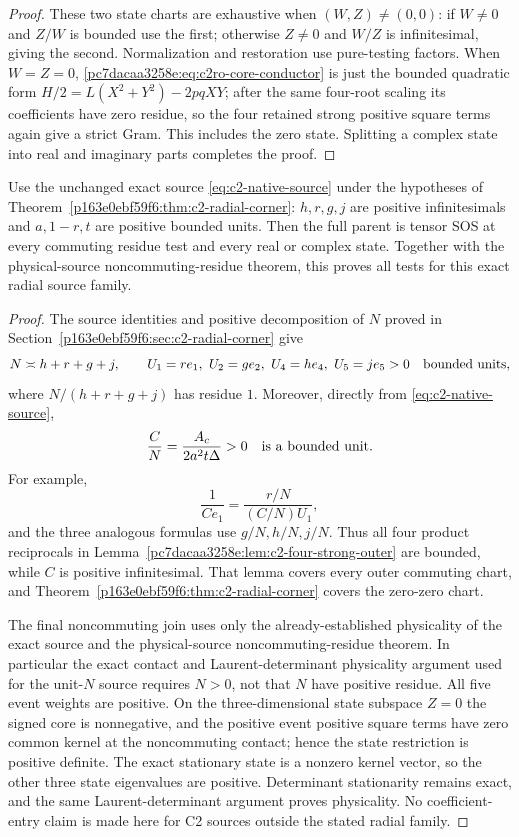 \begin{proof}
These two state charts are exhaustive when $(W,Z)\ne(0,0)$: if
$W\ne0$ and $Z/W$ is bounded use the first; otherwise $Z\ne0$ and
$W/Z$ is infinitesimal, giving the second.  Normalization and restoration
use pure-testing factors.  When $W=Z=0$,
\eqref{pc7dacaa3258e:eq:c2ro-core-conductor} is just the bounded quadratic form
$H/2=L(X^2+Y^2)-2pqXY$; after the same four-root scaling its
coefficients have zero residue, so the four retained strong positive square terms
again give a strict Gram.  This includes the zero state.  Splitting a
complex state into real and imaginary parts completes the proof.
\end{proof}

\begin{corollary}
\label{pc7dacaa3258e:cor:c2-radial-outer}
Use the unchanged exact source \eqref{eq:c2-native-source} under the hypotheses
of Theorem~\ref{p163e0ebf59f6:thm:c2-radial-corner}: $h,r,g,j$ are positive
infinitesimals and $a,1-r,t$ are positive bounded units.
Then the full parent is tensor SOS at every commuting residue test and
every real or complex state.  Together with the physical-source
noncommuting-residue theorem, this proves all tests for this exact
radial source family.
\end{corollary}
\begin{proof}
The source identities and positive decomposition of $N$ proved in
Section~\ref{p163e0ebf59f6:sec:c2-radial-corner} give
\[
 N\asymp h+r+g+j,\qquad
 U_1=re_1,\ U_2=ge_2,\ U_4=he_4,\ U_5=je_5>0
 \quad\hbox{bounded units},
\]
where $N/(h+r+g+j)$ has residue $1$.  Moreover, directly from
\eqref{eq:c2-native-source},
\[
 \frac CN=\frac{A_c}{2a^2t\Delta}>0
 \quad\hbox{is a bounded unit}.
\]
For example,
\[
 \frac1{Ce_1}=\frac{r/N}{(C/N)U_1},
\]
and the three analogous formulas use $g/N,h/N,j/N$.
Thus all four product reciprocals in
Lemma~\ref{pc7dacaa3258e:lem:c2-four-strong-outer} are bounded, while $C$ is positive
infinitesimal.  That lemma covers every outer commuting chart, and
Theorem~\ref{p163e0ebf59f6:thm:c2-radial-corner} covers the zero-zero chart.

The final noncommuting join uses only the already-established
physicality of the exact source and the physical-source
noncommuting-residue theorem.  In particular the exact contact and
Laurent-determinant physicality argument used for the unit-$N$ source
requires $N>0$, not that $N$ have positive residue.  All five event
weights are positive.  On the three-dimensional state subspace $Z=0$
the signed core is nonnegative, and the positive event positive square terms have
zero common kernel at the noncommuting contact; hence the state
restriction is positive definite.  The exact stationary state is a
nonzero kernel vector, so the other three state eigenvalues are positive.
Determinant stationarity remains exact, and the same Laurent-determinant
argument proves physicality.
No coefficient-entry claim is made here for C2 sources outside the
stated radial family.
\end{proof}

